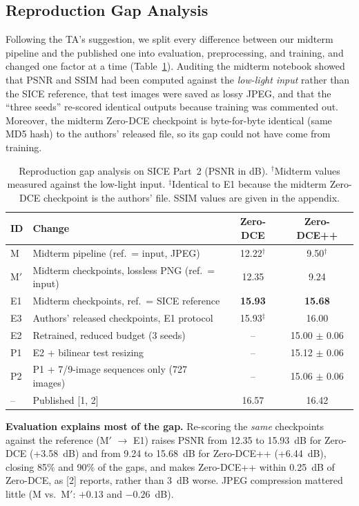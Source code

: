 \documentclass[11pt, letterpaper]{article}
\begin{document}
\subsection{Reproduction Gap Analysis}
\label{sec:gap}

Following the TA's suggestion, we split every difference between our midterm
pipeline and the published one into evaluation, preprocessing, and training, and
changed one factor at a time (Table~\ref{tab:gap}). Auditing the midterm notebook
showed that PSNR and SSIM had been computed against the \emph{low-light input}
rather than the SICE reference, that test images were saved as lossy JPEG, and
that the ``three seeds'' re-scored identical outputs because training was commented
out. Moreover, the midterm Zero-DCE checkpoint is byte-for-byte identical (same MD5
hash) to the authors' released file, so its gap could not have come from training.

\begin{table}[h]
\centering
\small\setlength{\tabcolsep}{4pt}
\begin{tabular}{llcc}
\toprule
\textbf{ID} & \textbf{Change} & \textbf{Zero-DCE} & \textbf{Zero-DCE++} \\
\midrule
M  & Midterm pipeline (ref.\ = input, JPEG) & 12.22$^\dagger$ & 9.50$^\dagger$ \\
M$'$ & Midterm checkpoints, lossless PNG (ref.\ = input) & 12.35 & 9.24 \\
E1 & Midterm checkpoints, ref.\ = SICE reference & \textbf{15.93} & \textbf{15.68} \\
E3 & Authors' released checkpoints, E1 protocol & 15.93$^\ddagger$ & 16.00 \\
E2 & Retrained, reduced budget (3 seeds) & -- & 15.00 $\pm$ 0.06 \\
P1 & E2 + bilinear test resizing & -- & 15.12 $\pm$ 0.06 \\
P2 & P1 + 7/9-image sequences only (727 images) & -- & 15.06 $\pm$ 0.06 \\
\midrule
-- & Published [1, 2] & 16.57 & 16.42 \\
\bottomrule
\end{tabular}
\caption{Reproduction gap analysis on SICE Part~2 (PSNR in dB).
$^\dagger$Midterm values measured against the low-light input.
$^\ddagger$Identical to E1 because the midterm Zero-DCE checkpoint is the authors'
file. SSIM values are given in the appendix.}
\label{tab:gap}
\end{table}

\textbf{Evaluation explains most of the gap.} Re-scoring the \emph{same}
checkpoints against the reference (M$'$ $\to$ E1) raises PSNR from 12.35 to
15.93~dB for Zero-DCE (+3.58~dB) and from 9.24 to 15.68~dB for Zero-DCE++
(+6.44~dB), closing 85\% and 90\% of the gaps, and makes Zero-DCE++ within 0.25~dB of
Zero-DCE, as [2] reports, rather than 3~dB worse. JPEG compression mattered little
(M vs.\ M$'$: $+0.13$ and $-0.26$~dB).
\end{document}
